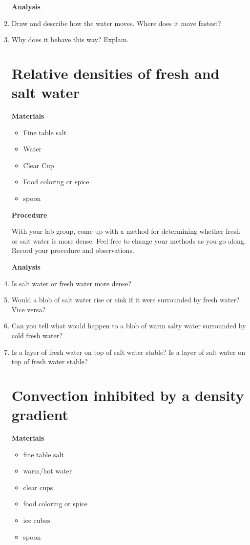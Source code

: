 \documentclass[12pt]{article}
\begin{document}
\begin{enumerate}
\vspace{.15in}
\textbf{Analysis}


\item Draw and describe how the water moves.  Where does it move fastest?
\item Why does it behave this way?  Explain.

\section{Relative densities of fresh and salt water}


\textbf{Materials}


\begin{itemize}
\item Fine table salt
\item Water
\item Clear Cup
\item Food coloring or spice
\item spoon
\end{itemize}


\textbf{Procedure}


With your lab group, come up with a method for determining whether fresh 
or salt water is more dense.  Feel free to change your methods 
as you go along.  Record your procedure and observations.

\vspace{.1in}
\textbf{Analysis}


\item Is salt water or fresh water more dense?
\item Would a blob of salt water rise or sink if it were surrounded by fresh water?  Vice versa?
\item Can you tell what would happen to a blob of warm salty water surrounded by cold fresh water?
\item Is a layer of fresh water on top of salt water stable?  Is a layer of salt water on top of fresh water stable?

\section{Convection inhibited by a density gradient}


\textbf{Materials}


\begin{itemize}
\item fine table salt
\item warm/hot water
\item clear cups
\item food coloring or spice
\item ice cubes
\item spoon
\end{itemize}


\end{enumerate}
\end{document}
